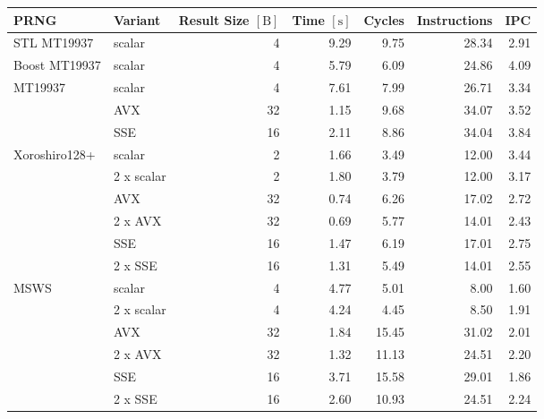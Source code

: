 \documentclass{stdlocal}
\begin{document}
\begin{tabular}{llrrrrr}
  \hline
  \textbf{PRNG} & \textbf{Variant} & \textbf{Result Size} $[\mathrm{B}]$ & \textbf{Time} $[\mathrm{s}]$ & \textbf{Cycles} & \textbf{Instructions} & \textbf{IPC} \\
  \hline
  \hline
  STL MT19937 & scalar & 4 & 9.29 & 9.75 & 28.34 & 2.91 \\
  \hline
  Boost MT19937 & scalar & 4 & 5.79 & 6.09 & 24.86 & 4.09 \\
  \hline
  \multirow{3}{*}{MT19937}
  & scalar & 4 & 7.61 & 7.99 & 26.71 & 3.34 \\
  & AVX & 32 & 1.15 & 9.68 & 34.07 & 3.52 \\
  & SSE & 16 & 2.11 & 8.86 & 34.04 & 3.84 \\
  \hline
  \multirow{6}{*}{Xoroshiro128+}
  & scalar & 2 & 1.66 & 3.49 & 12.00 & 3.44 \\
  & 2 x scalar & 2 & 1.80 & 3.79 & 12.00 & 3.17 \\
  & AVX & 32 & 0.74 & 6.26 & 17.02 & 2.72 \\
  & 2 x AVX & 32 & 0.69 & 5.77 & 14.01 & 2.43 \\
  & SSE & 16 & 1.47 & 6.19 & 17.01 & 2.75 \\
  & 2 x SSE & 16 & 1.31 & 5.49 & 14.01 & 2.55 \\
  \hline
  \multirow{6}{*}{MSWS}
  & scalar & 4 & 4.77 & 5.01 & 8.00 & 1.60 \\
  & 2 x scalar & 4 & 4.24 & 4.45 & 8.50 & 1.91 \\
  & AVX & 32 & 1.84 & 15.45 & 31.02 & 2.01 \\
  & 2 x AVX & 32 & 1.32 & 11.13 & 24.51 & 2.20 \\
  & SSE & 16 & 3.71 & 15.58 & 29.01 & 1.86 \\
  & 2 x SSE & 16 & 2.60 & 10.93 & 24.51 & 2.24 \\
  \hline
\end{tabular}
\end{document}
